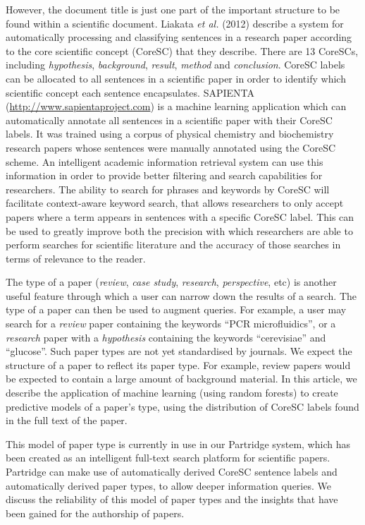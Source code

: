 \documentclass{svmult}
\begin{document}
However, the document title is just one part of the important structure to be
found within a scientific document.  Liakata \emph{et al.} (2012) describe a
system for automatically processing and classifying sentences in a research
paper according to the core scientific concept (CoreSC) that they
describe\cite{Liakata2012}.  There are 13 CoreSCs, including {\em hypothesis},
{\it background}, {\em result}, {\em method} and {\em conclusion}.  CoreSC
labels can be allocated to all sentences in a scientific paper in order to
identify which scientific concept each sentence encapsulates.  SAPIENTA
(\url{http://www.sapientaproject.com}) is a machine learning application which
can automatically annotate all sentences in a scientific paper with their
CoreSC labels. It was trained using a corpus of physical chemistry and
biochemistry research papers whose sentences were manually annotated using the
CoreSC\cite{LIAKATA10.644} scheme.  An intelligent academic information
retrieval system can use this information in order to provide better filtering
and search capabilities for researchers.  The ability to search for phrases and
keywords by CoreSC will facilitate context-aware keyword search, that allows
researchers to only accept papers where a term appears in sentences with a
specific CoreSC label.  This can be used to greatly improve both the precision
with which researchers are able to perform searches for scientific literature
and the accuracy of those searches in terms of relevance to the reader.

The type of a paper ({\em review}, {\em case study}, {\em research}, {\em
perspective}, etc) is another useful feature through which a user can narrow
down the results of a search.  The type of a paper can then be used to augment
queries.  For example, a user may search for a {\em review} paper containing
the keywords ``PCR microfluidics'', or a {\em research} paper with a {\em
hypothesis} containing the keywords ``cerevisiae'' and ``glucose''.   Such
paper types are not yet standardised by journals.  We expect the structure of a
paper to reflect its paper type.  For example, review papers would be expected
to contain a large amount of background material.  In this article, we describe
the application of machine learning (using random forests) to create predictive
models of a paper's type, using the distribution of CoreSC labels found in the
full text of the paper. 

This model of paper type is currently in use in our Partridge system, which has
been created as an intelligent full-text search platform for scientific papers.
Partridge can make use of automatically derived CoreSC sentence labels and
automatically derived paper types, to allow deeper information queries.  We
discuss the reliability of this model of paper types and the insights that have
been gained for the authorship of papers.
\end{document}
